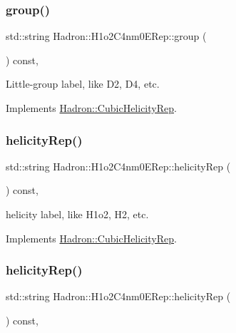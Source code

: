 \subsubsection{\texorpdfstring{group()}{group()}\hspace{0.1cm}{\footnotesize\ttfamily [2/2]}}
{\footnotesize\ttfamily std\+::string Hadron\+::\+H1o2\+C4nm0\+E\+Rep\+::group (\begin{DoxyParamCaption}{ }\end{DoxyParamCaption}) const\hspace{0.3cm}{\ttfamily [inline]}, {\ttfamily [virtual]}}

Little-\/group label, like D2, D4, etc. 

Implements \mbox{\hyperlink{structHadron_1_1CubicHelicityRep_a101a7d76cd8ccdad0f272db44b766113}{Hadron\+::\+Cubic\+Helicity\+Rep}}.

\mbox{\label{structHadron_1_1H1o2C4nm0ERep_a55678e61a56cf1cb02bc550ab0de0c55}} 
\subsubsection{\texorpdfstring{helicityRep()}{helicityRep()}\hspace{0.1cm}{\footnotesize\ttfamily [1/2]}}
{\footnotesize\ttfamily std\+::string Hadron\+::\+H1o2\+C4nm0\+E\+Rep\+::helicity\+Rep (\begin{DoxyParamCaption}{ }\end{DoxyParamCaption}) const\hspace{0.3cm}{\ttfamily [inline]}, {\ttfamily [virtual]}}

helicity label, like H1o2, H2, etc. 

Implements \mbox{\hyperlink{structHadron_1_1CubicHelicityRep_af1096946b7470edf0a55451cc662f231}{Hadron\+::\+Cubic\+Helicity\+Rep}}.

\mbox{\label{structHadron_1_1H1o2C4nm0ERep_a55678e61a56cf1cb02bc550ab0de0c55}} 
\subsubsection{\texorpdfstring{helicityRep()}{helicityRep()}\hspace{0.1cm}{\footnotesize\ttfamily [2/2]}}
{\footnotesize\ttfamily std\+::string Hadron\+::\+H1o2\+C4nm0\+E\+Rep\+::helicity\+Rep (\begin{DoxyParamCaption}{ }\end{DoxyParamCaption}) const\hspace{0.3cm}{\ttfamily [inline]}, {\ttfamily [virtual]}}

